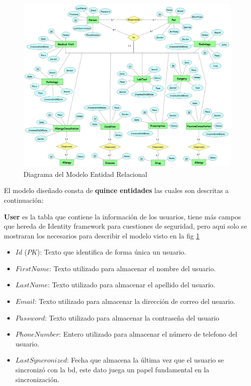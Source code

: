 \begin{figure}
	\centering
	\includegraphics[width = 15cm]{MainMatter/model.png}
	\caption{Diagrama del Modelo Entidad Relacional }
	\label{fig:model}
	
\end{figure}	
\newpage

El modelo diseñado consta de \textbf{quince entidades} las cuales son descritas a continuación:
\newline


\textbf{User} es la tabla que contiene la información  de los usuarios, tiene más campos que hereda de Identity framework para cuestiones de seguridad, pero aqui solo se mostraran los necesarios para describir el modelo visto en la  fig \ref{fig:model}

\begin{itemize}
	\item	$Id$ ($PK$): Texto que identifica de forma única un usuario.
	\item	$FirstName$: Texto utilizado para almacenar el nombre del usuario.
	\item	$LastName$: Texto utilizado para almacenar el apellido del usuario.

	\item	$Email$: Texto utilizado para almacenar la dirección de correo del usuario.
	\item	$Password$: Texto utilizado para almacenar la contraseña del usuario
	\item	$PhoneNumber$: Entero utilizado para almacenar el número de telefono del usuario.
	\item	$LastSyncronized$: Fecha que almacena la última vez que el usuario se sincronizó con la bd, este dato juega un papel fundamental en la sincronización.
	
	
\end{itemize}


